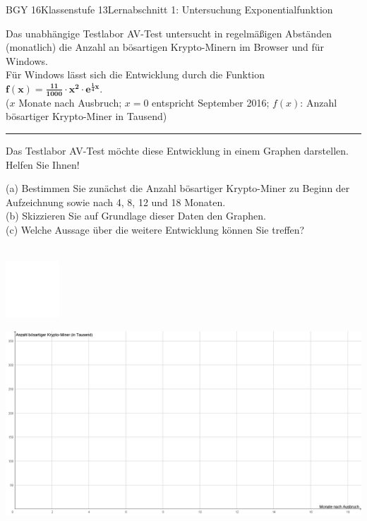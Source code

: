 \documentclass[oneside,openany,headings=optiontotoc,11pt,numbers=noenddot]{scrreprt}
\begin{document}
	\begin{worksheet}{BGY 16}{Klassenstufe 13}{Lernabschnitt 1: Untersuchung Exponentialfunktion}
				
		\noindent
		\sffamily
		\begin{framed}
			\noindent
			Das unabhängige Testlabor AV-Test untersucht in regelmäßigen Abständen (monatlich) die Anzahl an bösartigen Krypto-Minern im Browser und für Windows.\\
			Für Windows lässt sich die Entwicklung durch die Funktion \(\mathbf{f(x) = \frac{11}{1000}\cdot{}x^2\cdot{}e^{\frac{1}{4}x}}\).\\
			\tiny{(\(x\) Monate nach Ausbruch; \( x = 0\) entspricht September 2016; \(f(x)\): Anzahl bösartiger Krypto-Miner in Tausend)}\normalsize\\
			\rule{\textwidth}{0.1pt}
			\noindent
			Das Testlabor AV-Test möchte diese Entwicklung in einem Graphen darstellen.\\
			Helfen Sie Ihnen!\\
			\par\noindent
			(a) Bestimmen Sie zunächst die Anzahl bösartiger Krypto-Miner zu Beginn der Aufzeichnung sowie nach 4, 8, 12 und 18 Monaten.\\
			(b) Skizzieren Sie auf Grundlage dieser Daten den Graphen.\\
			(c) Welche Aussage über die weitere Entwicklung können Sie treffen?
		\end{framed}
		\begin{framed}
			\noindent
			\par\noindent
			\tiny{\color{codegray}{Notizen}}\\\normalsize
			\includegraphics[width=0.15\textwidth]{../../empty.jpg}\\
		\end{framed}
		\hspace{-45pt}\includegraphics[height=0.43\textheight]{../99_Bilder/KoordLeer.png}

\end{worksheet}
\end{document}
